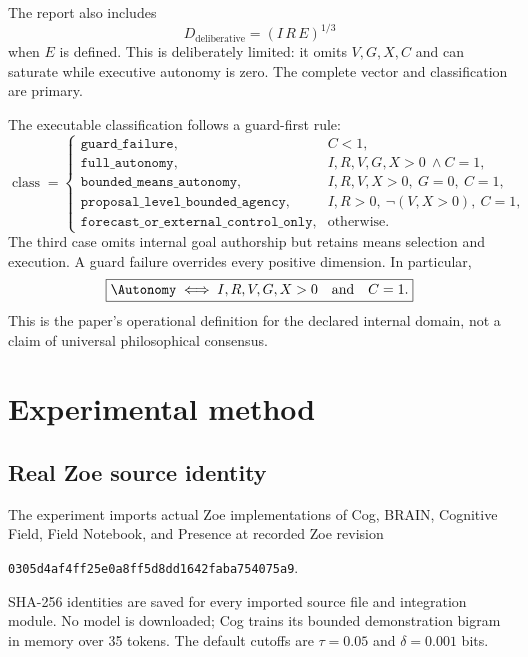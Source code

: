 The report also includes
\begin{equation}
D_{\mathrm{deliberative}}=(I\,R\,E)^{1/3}
\label{eq:deliberative}
\end{equation}
when $E$ is defined. This is deliberately limited: it omits $V,G,X,C$ and can saturate while executive autonomy is zero. The complete vector and classification are primary.

The executable classification follows a guard-first rule:
\begin{equation}
\operatorname{class}=
\begin{cases}
\texttt{guard\_failure},&C<1,\\
\texttt{full\_autonomy},&I,R,V,G,X>0\ \land C=1,\\
\texttt{bounded\_means\_autonomy},&I,R,V,X>0,\ G=0,\ C=1,\\
\texttt{proposal\_level\_bounded\_agency},&I,R>0,\ \neg(V,X>0),\ C=1,\\
\texttt{forecast\_or\_external\_control\_only},&\text{otherwise}.
\end{cases}
\label{eq:classification}
\end{equation}
The third case omits internal goal authorship but retains means selection and execution. A guard failure overrides every positive dimension. In particular,
\begin{equation}
\boxed{\Autonomy\iff I,R,V,G,X>0\quad\text{and}\quad C=1.}
\label{eq:full-autonomy}
\end{equation}
This is the paper's operational definition for the declared internal domain, not a claim of universal philosophical consensus.

\section{Experimental method}
\subsection{Real Zoe source identity}
The experiment imports actual Zoe implementations of Cog, BRAIN, Cognitive Field, Field Notebook, and Presence at recorded Zoe revision
\begin{center}
\texttt{0305d4af4ff25e0a8ff5d8dd1642faba754075a9}.
\end{center}
SHA-256 identities are saved for every imported source file and integration module. No model is downloaded; Cog trains its bounded demonstration bigram in memory over 35 tokens. The default cutoffs are $\tau=0.05$ and $\delta=0.001$ bits.

